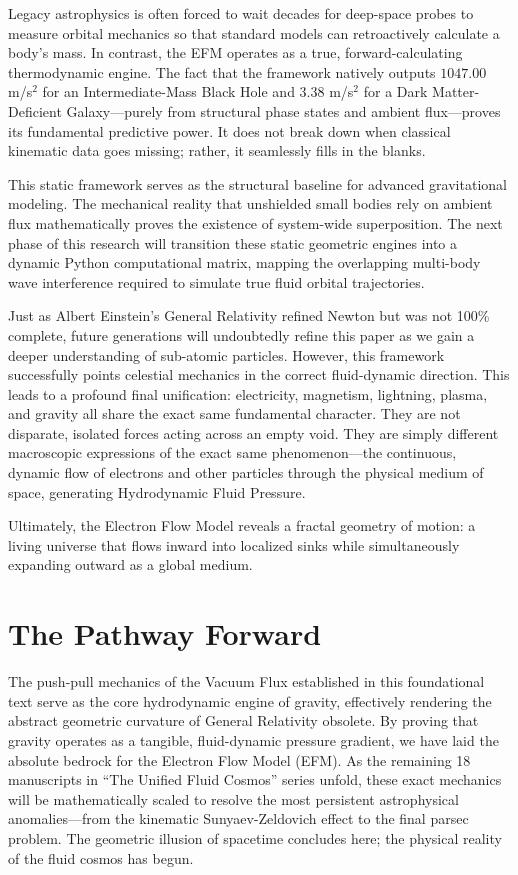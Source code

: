 \documentclass[11pt, a4paper]{article}
\begin{document}
  Legacy astrophysics is often forced to wait decades for deep-space probes to measure orbital mechanics so that standard models can retroactively calculate a body's mass. In contrast, the EFM operates as a true, forward-calculating thermodynamic engine. The fact that the framework natively outputs $1047.00$ m/s$^2$ for an Intermediate-Mass Black Hole and $3.38$ m/s$^2$ for a Dark Matter-Deficient Galaxy---purely from structural phase states and ambient flux---proves its fundamental predictive power. It does not break down when classical kinematic data goes missing; rather, it seamlessly fills in the blanks.

  This static framework serves as the structural baseline for advanced gravitational modeling. The mechanical reality that unshielded small bodies rely on ambient flux mathematically proves the existence of system-wide superposition. The next phase of this research will transition these static geometric engines into a dynamic Python computational matrix, mapping the overlapping multi-body wave interference required to simulate true fluid orbital trajectories.

  Just as Albert Einstein's General Relativity refined Newton but was not 100\% complete, future generations will undoubtedly refine this paper as we gain a deeper understanding of sub-atomic particles. However, this framework successfully points celestial mechanics in the correct fluid-dynamic direction. This leads to a profound final unification: electricity, magnetism, lightning, plasma, and gravity all share the exact same fundamental character. They are not disparate, isolated forces acting across an empty void. They are simply different macroscopic expressions of the exact same phenomenon---the continuous, dynamic flow of electrons and other particles through the physical medium of space, generating Hydrodynamic Fluid Pressure.

  Ultimately, the Electron Flow Model reveals a fractal geometry of motion: a living universe that flows inward into localized sinks while simultaneously expanding outward as a global medium.

\section*{The Pathway Forward}
  The push-pull mechanics of the Vacuum Flux established in this foundational text serve as the core hydrodynamic engine of gravity, effectively rendering the abstract geometric curvature of General Relativity obsolete. By proving that gravity operates as a tangible, fluid-dynamic pressure gradient, we have laid the absolute bedrock for the Electron Flow Model (EFM). As the remaining 18 manuscripts in ``The Unified Fluid Cosmos'' series unfold, these exact mechanics will be mathematically scaled to resolve the most persistent astrophysical anomalies---from the kinematic Sunyaev-Zeldovich effect to the final parsec problem. The geometric illusion of spacetime concludes here; the physical reality of the fluid cosmos has begun.
  
\end{document}

